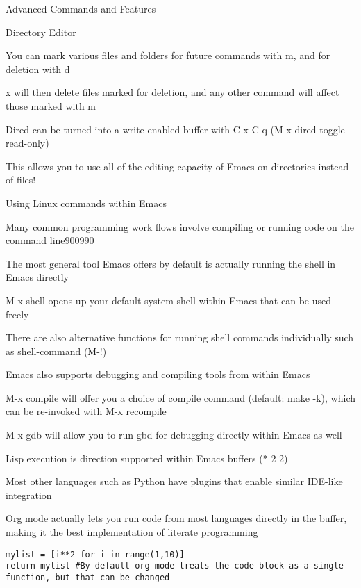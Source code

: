 \documentclass[presentation]{beamer}
\begin{document}
\begin{frame}[fragile,label=sec-4]{Advanced Commands and Features}
\begin{block}{Directory Editor}
\begin{block}{You can mark various files and folders for future commands with m, and for deletion with d}
\begin{block}{x will then delete files marked for deletion, and any other command will affect those marked with m}
\end{block}
\end{block}
\begin{block}{Dired can be turned into a write enabled buffer with C-x C-q (M-x dired-toggle-read-only)}
\begin{block}{This allows you to use all of the editing capacity of Emacs on directories instead of files!}
\end{block}
\end{block}
\end{block}
\begin{block}{Using Linux commands within Emacs}
\begin{block}{Many common programming work flows involve compiling or running code on the command line900990}
\end{block}
\begin{block}{The most general tool Emacs offers by default is actually running the shell in Emacs directly}
\begin{block}{M-x shell opens up your default system shell within Emacs that can be used freely}
\end{block}
\begin{block}{There are also alternative functions for running shell commands individually such as shell-command (M-!)}
\end{block}
\end{block}
\begin{block}{Emacs also supports debugging and compiling tools from within Emacs}
\begin{block}{M-x compile will offer you a choice of compile command (default: make -k), which can be re-invoked with M-x recompile}
\end{block}
\begin{block}{M-x gdb will allow you to run gbd for debugging directly within Emacs as well}
\end{block}
\end{block}
\begin{block}{Lisp execution is direction supported within Emacs buffers (* 2 2)}
\end{block}
\begin{block}{Most other languages such as Python have plugins that enable similar IDE-like integration}
\end{block}
\begin{block}{Org mode actually lets you run code from most languages directly in the buffer, making it the best implementation of literate programming}
\begin{verbatim}
mylist = [i**2 for i in range(1,10)]
return mylist #By default org mode treats the code block as a single function, but that can be changed
\end{verbatim}


\end{block}
\end{block}
\end{frame}
\end{document}
